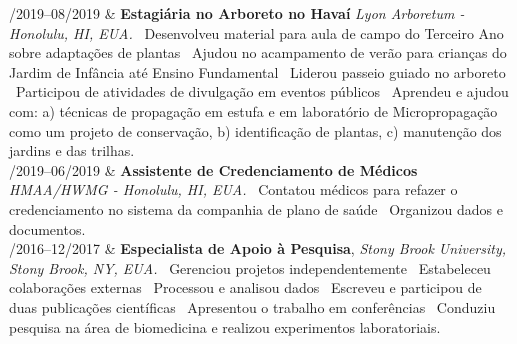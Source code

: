 \documentclass[11pt, a4paper]{article}
\newcommand{\Duration}[2]{\fontsize{10pt}{0}\selectfont #1--#2}
\begin{document}
\begin{EntriesTable}


	\Duration{06/2019}{08/2019}  &
	\textbf{Estagiária no Arboreto no Havaí}
	\newline
	\textit{Lyon Arboretum - Honolulu, HI, EUA.}
	\newline
	\textbullet \ Desenvolveu material para aula de campo do Terceiro 
	Ano sobre adaptações de plantas 
	\textbullet \ Ajudou no acampamento de verão para 
	crianças do Jardim de Infância até Ensino Fundamental 
	\textbullet \ Liderou passeio guiado no arboreto 
	\textbullet \ Participou de atividades de divulgação em 
	eventos públicos 
	\textbullet \ Aprendeu e ajudou com: a) técnicas de propagação em estufa
	e em laboratório de Micropropagação como um projeto de conservação, b)
	identificação de plantas, c) manutenção dos jardins e das trilhas.
	\\

	\Duration{03/2019}{06/2019}  &
	\textbf{Assistente de Credenciamento de Médicos}
	\newline
	\textit{HMAA/HWMG - Honolulu, HI, EUA.}
	\newline
	\textbullet \ Contatou médicos para refazer o credenciamento no sistema 
	da companhia de plano de saúde 
	\textbullet \ Organizou dados e documentos.
	\\

	\Duration{08/2016}{12/2017}  &
	\textbf{Especialista de Apoio à Pesquisa},
	\newline
	\textit{Stony Brook University, Stony Brook, NY, EUA.}
	\newline
	\textbullet \ Gerenciou projetos independentemente 
	\textbullet \ Estabeleceu colaborações externas 
	\textbullet \ Processou e analisou dados 
	\textbullet \ Escreveu e participou de duas publicações científicas 
	\textbullet \ Apresentou o trabalho em conferências 
	\textbullet\ Conduziu pesquisa na área de biomedicina e realizou 
	experimentos laboratoriais.
	\\

\end{EntriesTable}
\end{document}
